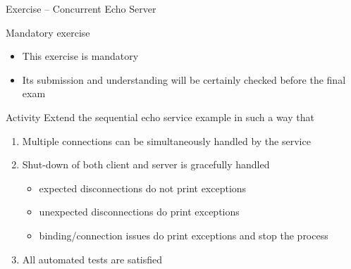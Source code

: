 \documentclass[presentation]{beamer}\mode<presentation>{\usetheme{AMSBolognaFC}}
\begin{document}
\startExercise

\begin{frame}[c,allowframebreaks]{Exercise \currentExercise{} -- Concurrent Echo Server}

    \begin{alertblock}{Mandatory exercise}
        \begin{itemize}
            \item This exercise is mandatory
            \item Its submission and understanding will be certainly checked before the final exam
        \end{itemize}
    \end{alertblock}

    \begin{block}{Activity}
        Extend the sequential echo service example in such a way that
        \begin{enumerate}
            \item Multiple connections can be simultaneously handled by the service
            \item Shut-down of both client and server is gracefully handled
            \begin{itemize}
                \item expected disconnections do not print exceptions
                \item unexpected disconnections do print exceptions
                \item binding/connection issues do print exceptions and stop the process
            \end{itemize}

            \item All automated tests are satisfied
        \end{enumerate}
    \end{block}

\end{frame}


\section*{}

\frame{\titlepage}
\end{document}
